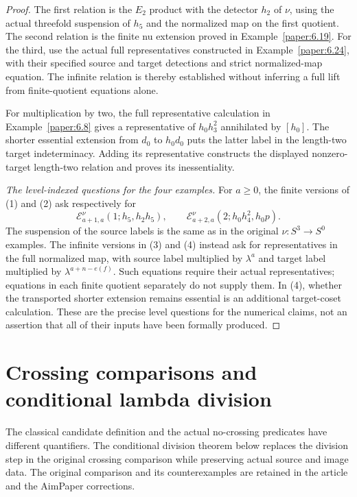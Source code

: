\begin{proof}
The first relation is the $E_2$ product with the detector $h_2$ of $\nu$, using the actual threefold suspension of $h_5$ and the normalized map on the first quotient. The second relation is the finite nu extension proved in Example~\ref{paper:6.19}. For the third, use the actual full representatives constructed in Example~\ref{paper:6.24}, with their specified source and target detections and strict normalized-map equation. The infinite relation is thereby established without inferring a full lift from finite-quotient equations alone.

For multiplication by two, the full representative calculation in Example~\ref{paper:6.8} gives a representative of $h_0h_3^2$ annihilated by $[h_0]$. The shorter essential extension from $d_0$ to $h_0d_0$ puts the latter label in the length-two target indeterminacy. Adding its representative constructs the displayed nonzero-target length-two relation and proves its inessentiality.

\textit{The level-indexed questions for the four examples.}
For $a\geq0$, the finite versions of (1) and (2) ask respectively for
\[
\mathcal E^\nu_{a+1,a}(1;h_5,h_2h_5),\qquad
\mathcal E^\nu_{a+2,a}(2;h_0h_4^2,h_0p).
\]
The suspension of the source labels is the same as in the original
$\nu:S^3\to S^0$ examples. The infinite versions in (3) and (4)
instead ask for representatives in the full normalized map, with
source label multiplied by $\lambda^a$ and target label multiplied
by $\lambda^{a+n-e(f)}$. Such equations require their actual
representatives; equations in each finite quotient separately do not
supply them. In (4), whether the transported shorter extension
remains essential is an additional target-coset calculation.
These are the precise level questions for the numerical claims,
not an assertion that all of their inputs have been formally produced.
\end{proof}

\section{Crossing comparisons and conditional lambda division}

The classical candidate definition and the actual no-crossing predicates
have different quantifiers. The conditional division theorem below
replaces the division step in the original crossing comparison while
preserving actual source and image data. The original comparison and
its counterexamples are retained in the article and the AimPaper corrections.

